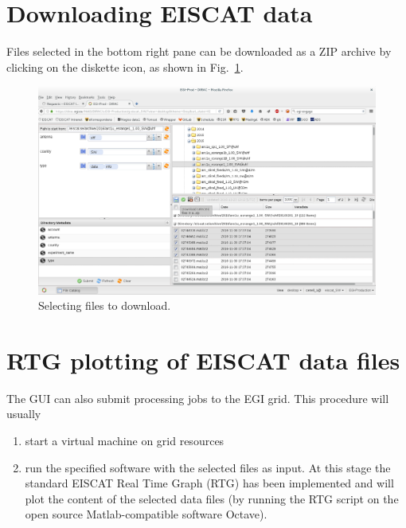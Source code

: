 \documentclass[a4paper]{article}
\begin{document}
\section{Downloading EISCAT data}
\label{sec:download}


Files selected in the bottom right pane can be downloaded as a ZIP
archive by clicking on the diskette icon, as shown in
Fig.~\ref{fig:download}.
\begin{figure}[htb]
  \centering
  \includegraphics[width=1.0\linewidth]{dirac-gui-download}
  \caption{Selecting files to download.}
  \label{fig:download}
\end{figure}

\section{RTG plotting of EISCAT data files}
\label{sec:rtg}

The GUI can also submit processing jobs to the EGI grid. This procedure will usually

\begin{enumerate}
\item start a virtual machine on grid resources

\item run the specified software with the selected files as input. At
  this stage the standard EISCAT Real Time Graph (RTG) has been
  implemented and will plot the content of the selected data files (by
  running the RTG script on the open source Matlab-compatible software
  Octave).

\end{enumerate}
\end{document}
